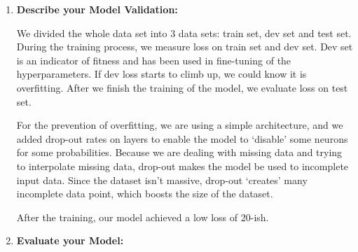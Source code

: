 \documentclass[11pt, a4paper]{article}
\begin{document}
\begin{enumerate}
	\item {\textbf{Describe your Model Validation:}}
	\par{We divided the whole data set into 3 data sets: train set, dev set and test set. During the training process, we measure loss on train set and dev set. Dev set is an indicator of fitness and has been used in fine-tuning of the hyperparameters. If dev loss starts to climb up, we could know it is overfitting. After we finish the training of the model, we evaluate loss on test set.}
	\par{For the prevention of overfitting, we are using a simple architecture, and we added drop-out rates on layers to enable the model to `disable' some neurons for some probabilities. Because we are dealing with missing data and trying to interpolate missing data, drop-out makes the model be used to incomplete input data. Since the dataset isn't massive, drop-out `creates' many incomplete data point, which boosts the size of the dataset.}
	\par{After the training, our model achieved a low loss of 20-ish.}
	
	\item {\textbf{Evaluate your Model:}}
	
	
	

\end{enumerate}
\end{document}
